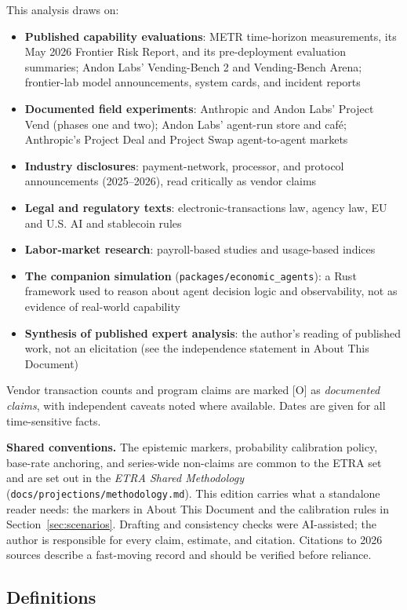 \documentclass[11pt,letterpaper]{article}
\begin{document}
This analysis draws on:
\begin{itemize}
  \item \textbf{Published capability evaluations}: METR time-horizon measurements, its May 2026 Frontier Risk Report, and its pre-deployment evaluation summaries; Andon Labs' Vending-Bench 2 and Vending-Bench Arena; frontier-lab model announcements, system cards, and incident reports
  \item \textbf{Documented field experiments}: Anthropic and Andon Labs' Project Vend (phases one and two); Andon Labs' agent-run store and caf\'e; Anthropic's Project Deal and Project Swap agent-to-agent markets
  \item \textbf{Industry disclosures}: payment-network, processor, and protocol announcements (2025--2026), read critically as vendor claims
  \item \textbf{Legal and regulatory texts}: electronic-transactions law, agency law, EU and U.S. AI and stablecoin rules
  \item \textbf{Labor-market research}: payroll-based studies and usage-based indices
  \item \textbf{The companion simulation} (\texttt{packages/economic\_agents}): a Rust framework used to reason about agent decision logic and observability, not as evidence of real-world capability
  \item \textbf{Synthesis of published expert analysis}: the author's reading of published work, not an elicitation (see the independence statement in About This Document)
\end{itemize}

Vendor transaction counts and program claims are marked [O] as \textit{documented claims}, with independent caveats noted where available. Dates are given for all time-sensitive facts.

\textbf{Shared conventions.} The epistemic markers, probability calibration policy, base-rate anchoring, and series-wide non-claims are common to the ETRA set and are set out in the \textit{ETRA Shared Methodology} (\texttt{docs/projections/methodology.md}). This edition carries what a standalone reader needs: the markers in About This Document and the calibration rules in Section~\ref{sec:scenarios}. Drafting and consistency checks were AI-assisted; the author is responsible for every claim, estimate, and citation. Citations to 2026 sources describe a fast-moving record and should be verified before reliance.

\subsection{Definitions}
\label{sec:definitions}
\end{document}
